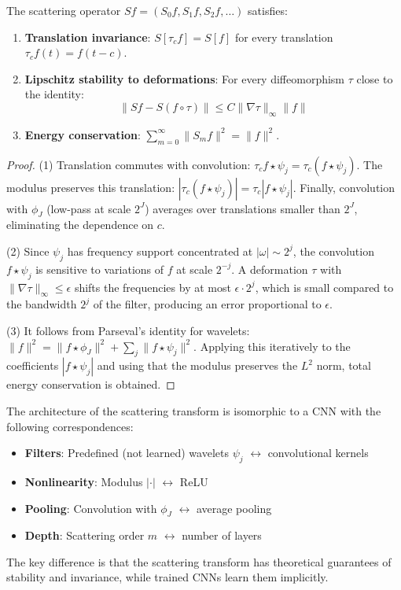 \begin{proposition}\label{prop:propiedades_scattering}
The scattering operator $Sf = (S_0 f, S_1 f, S_2 f, \ldots)$ satisfies:
\begin{enumerate}
    \item \textbf{Translation invariance}: $S[\tau_c f] = S[f]$ for every translation $\tau_c f(t) = f(t - c)$.
    \item \textbf{Lipschitz stability to deformations}: For every diffeomorphism $\tau$ close to the identity:
    \begin{equation}
    \|Sf - S(f \circ \tau)\| \leq C\|\nabla \tau\|_\infty \|f\|
    \end{equation}
    \item \textbf{Energy conservation}: $\sum_{m=0}^{\infty} \|S_m f\|^2 = \|f\|^2$.
\end{enumerate}
\end{proposition}

\begin{proof}
(1) Translation commutes with convolution: $\tau_c f \star \psi_j = \tau_c(f \star \psi_j)$. The modulus preserves this translation: $|\tau_c(f \star \psi_j)| = \tau_c|f \star \psi_j|$. Finally, convolution with $\phi_J$ (low-pass at scale $2^J$) averages over translations smaller than $2^J$, eliminating the dependence on $c$.

(2) Since $\psi_j$ has frequency support concentrated at $|\omega| \sim 2^j$, the convolution $f \star \psi_j$ is sensitive to variations of $f$ at scale $2^{-j}$. A deformation $\tau$ with $\|\nabla \tau\|_\infty \leq \epsilon$ shifts the frequencies by at most $\epsilon \cdot 2^j$, which is small compared to the bandwidth $2^j$ of the filter, producing an error proportional to $\epsilon$.

(3) It follows from Parseval's identity for wavelets: $\|f\|^2 = \|f \star \phi_J\|^2 + \sum_j \|f \star \psi_j\|^2$. Applying this iteratively to the coefficients $|f \star \psi_j|$ and using that the modulus preserves the $L^2$ norm, total energy conservation is obtained.
\end{proof}

\begin{remark}
The architecture of the scattering transform is isomorphic to a CNN with the following correspondences:
\begin{itemize}
    \item \textbf{Filters}: Predefined (not learned) wavelets $\psi_j$ $\leftrightarrow$ convolutional kernels
    \item \textbf{Nonlinearity}: Modulus $|{\cdot}|$ $\leftrightarrow$ ReLU
    \item \textbf{Pooling}: Convolution with $\phi_J$ $\leftrightarrow$ average pooling
    \item \textbf{Depth}: Scattering order $m$ $\leftrightarrow$ number of layers
\end{itemize}
The key difference is that the scattering transform has theoretical guarantees of stability and invariance, while trained CNNs learn them implicitly.
\end{remark}

